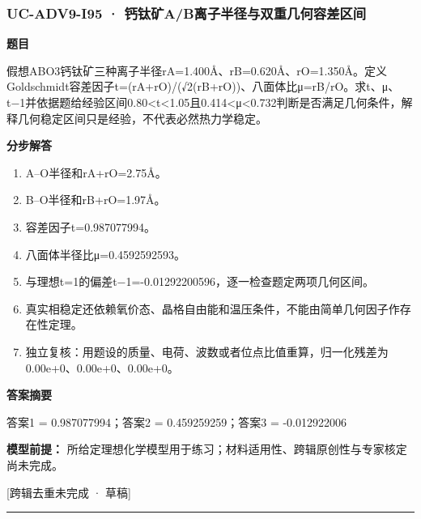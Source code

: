 \documentclass[UTF8,11pt,a4paper]{ctexart}
\begin{document}
\subsubsection*{UC-ADV9-I95 · 钙钛矿A/B离子半径与双重几何容差区间}
\noindent\textbf{题目}\par
假想ABO3钙钛矿三种离子半径rA=1.400Å、rB=0.620Å、rO=1.350Å。定义Goldschmidt容差因子t=(rA+rO)/(√2(rB+rO))、八面体比μ=rB/rO。求t、μ、t−1并依据题给经验区间0.80<t<1.05且0.414<μ<0.732判断是否满足几何条件，解释几何稳定区间只是经验，不代表必然热力学稳定。\par
\medskip\noindent\textbf{分步解答}
\begin{enumerate}
\item A–O半径和rA+rO=2.75Å。
\item B–O半径和rB+rO=1.97Å。
\item 容差因子t=0.987077994。
\item 八面体半径比μ=0.4592592593。
\item 与理想t=1的偏差t−1=-0.01292200596，逐一检查题定两项几何区间。
\item 真实相稳定还依赖氧价态、晶格自由能和温压条件，不能由简单几何因子作存在性定理。
\item 独立复核：用题设的质量、电荷、波数或者位点比值重算，归一化残差为0.00e+0、0.00e+0、0.00e+0。
\end{enumerate}
\noindent\textbf{答案摘要}\par
答案1 = 0.987077994；答案2 = 0.459259259；答案3 = -0.012922006\par
\noindent\textbf{模型前提：}
所给定理想化学模型用于练习；材料适用性、跨辑原创性与专家核定尚未完成。\par
\noindent\textcolor{red!65!black}{[跨辑去重未完成 · 草稿]} \par
\medskip\hrule\medskip
{}
\end{document}
